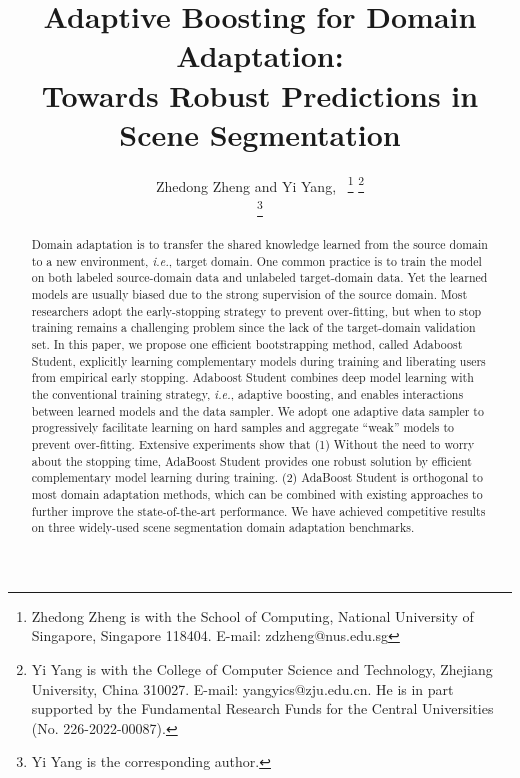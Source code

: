 \documentclass[journal]{IEEEtran}
\def\ie{\emph{i.e.}}
\begin{document}
\title{Adaptive Boosting for Domain Adaptation: 
\\Towards Robust Predictions in Scene Segmentation}

\author{Zhedong Zheng and Yi Yang,~ 
\thanks{Zhedong Zheng is with the School of Computing, National University of Singapore, Singapore 118404. E-mail: zdzheng@nus.edu.sg}
\thanks{
Yi Yang is with the College of Computer Science and Technology, Zhejiang
University, China 310027. E-mail: yangyics@zju.edu.cn. He is in part supported by the Fundamental Research Funds for the Central Universities (No. 226-2022-00087). }

\thanks{Yi Yang is the corresponding author.}
}


\maketitle


\begin{abstract}
Domain adaptation is to transfer the shared knowledge learned from the source domain to a new environment, \ie, target domain. One common practice is to train the model on both labeled source-domain data and unlabeled target-domain data. Yet the learned models are usually biased due to the strong supervision of the source domain. Most researchers adopt the early-stopping strategy to prevent over-fitting, but when to stop training remains a challenging problem since the lack of the target-domain validation set. 
In this paper, we propose one efficient bootstrapping method, called Adaboost Student, explicitly learning complementary models during training and liberating users from empirical early stopping. Adaboost Student combines deep model learning with the conventional training strategy, \ie, adaptive boosting, and enables interactions between learned models and the data sampler.
We adopt one adaptive data sampler to progressively facilitate learning on hard samples and aggregate ``weak'' models to prevent over-fitting. 
Extensive experiments show that (1) Without the need to worry about the stopping time, AdaBoost Student provides one robust solution by efficient complementary model learning during training. 
(2) AdaBoost Student is orthogonal to most domain adaptation methods, which can be combined with existing approaches to further improve the state-of-the-art performance. We have achieved competitive results on three widely-used scene segmentation domain adaptation benchmarks.  
\end{abstract}
\end{document}
